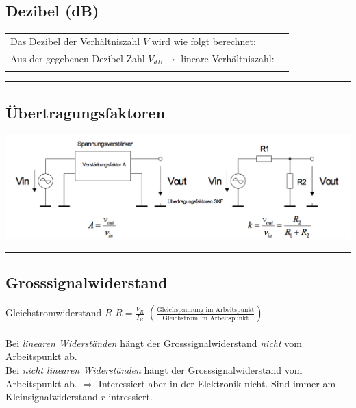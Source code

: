 	
		\subsection{Dezibel (dB) }
			\begin{tabular}{p{10cm}p{8cm}}
        		Das Dezibel der Verhältniszahl $V$ wird wie folgt berechnet:
        		& \fbox{$V_{dB}=20 log \left| V\right|$}\\
        		Aus der gegebenen Dezibel-Zahl $V_{dB}\to$ lineare Verhältniszahl:
        		& \fbox{$V=10^{\frac{V_{dB}}{20dB}}$}\\ \\
        \end{tabular}

\hrule

		\subsection{Übertragungsfaktoren }
			\begin{minipage}{18cm}
	   	    	\includegraphics[width=16cm]{./bilder/uebertragungsfaktoren.png}
       		\end{minipage}

\hrule

		\subsection{Grosssignalwiderstand }
			Gleichstromwiderstand $R$ \hspace{15mm} $R=\frac{V_R}{I_R}$
			$\left(\frac{\mbox{Gleichspannung im Arbeitspunkt}}{\mbox{Gleichstrom im
			Arbeitspunkt}}\right)$\\ \\
			Bei {\it linearen Widerständen} hängt der Grosssignalwiderstand
			{\it nicht} vom Arbeitspunkt ab.\\
			Bei {\it nicht linearen Widerständen} hängt der Grosssignalwiderstand
			vom Arbeitspunkt ab. $\Rightarrow$ Interessiert aber in der Elektronik nicht.
			Sind immer am Kleinsignalwiderstand $r$ intressiert.\\
		
